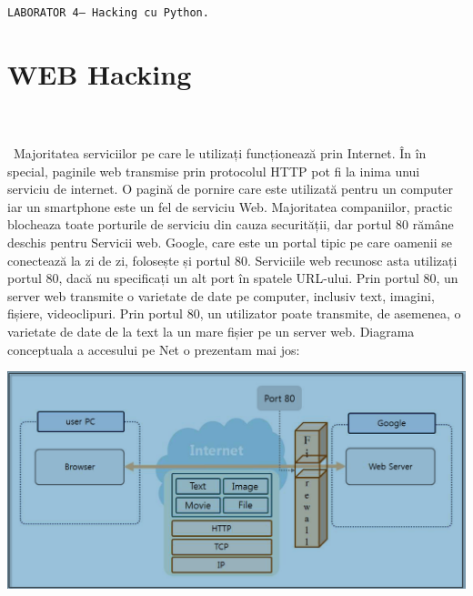 \documentclass[oneside,20pt]{article}          %
\begin{document}

\noindent 
\begin{center}
  \texttt{LABORATOR 4-- Hacking cu Python.}        
\end{center}

\section{WEB Hacking}
\noindent                 
\\\\\
Majoritatea serviciilor pe care le utilizați funcționează prin Internet. În
în special, paginile web transmise prin protocolul HTTP pot fi la inima unui serviciu de internet. O pagină de pornire care este utilizată pentru un computer
iar un smartphone este un fel de serviciu Web. Majoritatea companiilor, practic blocheaza toate porturile de serviciu din cauza securității, dar portul 80 rămâne deschis pentru Servicii web. Google, care este un portal tipic pe care oamenii se conectează la zi de zi, folosește și portul 80. Serviciile web recunosc asta
utilizați portul 80, dacă nu specificați un alt port în spatele URL-ului. Prin portul 80, un server web transmite o varietate
de date pe computer, inclusiv text, imagini, fișiere, videoclipuri. Prin portul 80, un utilizator poate transmite, de asemenea, o varietate de date de la text la un mare fișier pe un server web. Diagrama conceptuala a accesului pe Net o prezentam mai jos:
\begin{center}
\includegraphics[height = 5 cm]{1.png}
\end{center}
\end{document}
